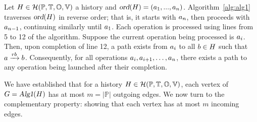 \documentclass[12pt]{article}
\begin{document}
\vspace{1em}

\begin{remark}\label{rem:pathOnTheWay}
Let $H\in\mathcal{H}(\mathbb{P}, \mathbb{T}, \mathbb{O}, \mathbb{V})$ a history and \mbox{$\textsl{ord}(H)=(a_1,...,a_n)$}. Algorithm~\ref{alg:alg1} traverses $\textsl{ord}(H)$ in reverse order; that is, it starts with $a_n$, then proceeds with $a_{n-1}$, continuing similarly until $a_1$. Each operation is processed using lines from 5 to 12 of the algorithm. Suppose the current operation being processed is $a_i$. Then, upon completion of line 12, a path exists from $a_i$ to all $b\in H$ such that $a\xrightarrow{rb}b$. Consequently, for all operations $a_i, a_{i+1}, \ldots, a_n$, there exists a path to any operation being launched after their completion.
\end{remark}

\vspace{1em}

We have established that for a history $H\in\mathcal{H}(\mathbb{P}, \mathbb{T}, \mathbb{O}, \mathbb{V})$, each vertex of $G=\textsl{Alg1}(H)$ has at most $m=|\mathbb{P}|$ outgoing edges. We now turn to the complementary property: showing that each vertex has at most $m$ incoming edges.
\vspace{1em}
\end{document}
